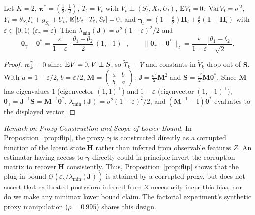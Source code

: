 \begin{proposition}
\label{prop:flip}
Let $K=2$, $\boldsymbol\pi^*=(\tfrac12,\tfrac12)$, $T_t=V_t$ with $V_t\perp(S_t,X_t,U_t)$, $\mathbb{E} V_t=0$, $\mathrm{Var} V_t=\sigma^2$, $Y_t=\theta_{S_t}T_t+g_{S_t}+U_t$, $\mathbb{E}[U_t\mid T_t,S_t]=0$, and $\boldsymbol\gamma_t=(1-\tfrac\varepsilon2)\boldsymbol H_t+\tfrac\varepsilon2(\boldsymbol 1-\boldsymbol H_t)$ with $\varepsilon\in[0,1)$ ($\varepsilon_\gamma=\varepsilon$). Then $\lambda_{\min}(\boldsymbol J)=\sigma^2(1-\varepsilon)^2/2$ and
\begin{equation}
\boldsymbol\theta_\gamma-\boldsymbol\theta^*=\frac{\varepsilon}{1-\varepsilon}\cdot\frac{\theta_1-\theta_2}{2}\,(1,-1)^\top,\qquad
\|\boldsymbol\theta_\gamma-\boldsymbol\theta^*\|_2=\frac{\varepsilon}{1-\varepsilon}\frac{|\theta_1-\theta_2|}{\sqrt2}.
\end{equation}
\end{proposition}
\begin{proof}
$m^\gamma_k=0$ since $\mathbb{E} V=0, V\perp S$, so $\tilde T_k=V$ and constants in $\tilde Y_k$ drop out of $\boldsymbol S$. With $a=1-\varepsilon/2$, $b=\varepsilon/2$, $\boldsymbol M=\left(\begin{smallmatrix}a&b\\b&a\end{smallmatrix}\right)$: $\boldsymbol J=\frac{\sigma^2}{2}\boldsymbol M^2$ and $\boldsymbol S=\frac{\sigma^2}{2}\boldsymbol M\boldsymbol\theta^*$. Since $\boldsymbol M$ has eigenvalues $1$ (eigenvector $(1,1)^\top$) and $1-\varepsilon$ (eigenvector $(1,-1)^\top$), $\boldsymbol\theta_\gamma=\boldsymbol J^{-1}\boldsymbol S=\boldsymbol M^{-1}\boldsymbol\theta^*$, $\lambda_{\min}(\boldsymbol J)=\sigma^2(1-\varepsilon)^2/2$, and $(\boldsymbol M^{-1}-\boldsymbol I)\boldsymbol\theta^*$ evaluates to the displayed vector.
\end{proof}

\textit{Remark on Proxy Construction and Scope of Lower Bound.} In Proposition~\ref{prop:flip}, the proxy $\boldsymbol{\gamma}$ is constructed directly as a corrupted function of the latent state $\boldsymbol{H}$ rather than inferred from observable features $Z$. An estimator having access to $\boldsymbol{\gamma}$ directly could in principle invert the corruption matrix to recover $\boldsymbol{H}$ consistently. Thus, Proposition~\ref{prop:flip} shows that the plug-in bound $\mathcal{O}(\varepsilon_\gamma / \lambda_{\min}(\boldsymbol{J}))$ is attained by a corrupted proxy, but does not assert that calibrated posteriors inferred from $Z$ necessarily incur this bias, nor do we make any minimax lower bound claim. The factorial experiment's synthetic proxy manipulation ($\rho=0.995$) shares this design.

